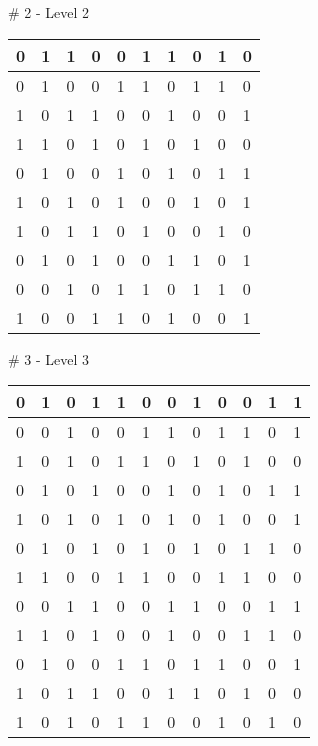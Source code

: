 \smallskip

\# 2 - Level 2 \newline
\begin{tabular}{|m{\collen}|m{\collen}|m{\collen}|m{\collen}|m{\collen}|m{\collen}|m{\collen}|m{\collen}|m{\collen}|m{\collen}|}
\hline
  0 & 1 & 1 & 0 & 0 & 1 & 1 & 0 & 1 & 0 \\
\hline
  0 & 1 & 0 & 0 & 1 & 1 & 0 & 1 & 1 & 0 \\
\hline
  1 & 0 & 1 & 1 & 0 & 0 & 1 & 0 & 0 & 1 \\
\hline
  1 & 1 & 0 & 1 & 0 & 1 & 0 & 1 & 0 & 0 \\
\hline
  0 & 1 & 0 & 0 & 1 & 0 & 1 & 0 & 1 & 1 \\
\hline
  1 & 0 & 1 & 0 & 1 & 0 & 0 & 1 & 0 & 1 \\
\hline
  1 & 0 & 1 & 1 & 0 & 1 & 0 & 0 & 1 & 0 \\
\hline
  0 & 1 & 0 & 1 & 0 & 0 & 1 & 1 & 0 & 1 \\
\hline
  0 & 0 & 1 & 0 & 1 & 1 & 0 & 1 & 1 & 0 \\
\hline
  1 & 0 & 0 & 1 & 1 & 0 & 1 & 0 & 0 & 1 \\
\hline
\end{tabular}


\smallskip

\# 3 - Level 3 \newline
\begin{tabular}{|m{\collen}|m{\collen}|m{\collen}|m{\collen}|m{\collen}|m{\collen}|m{\collen}|m{\collen}|m{\collen}|m{\collen}|m{\collen}|m{\collen}|}
\hline
  0 & 1 & 0 & 1 & 1 & 0 & 0 & 1 & 0 & 0 & 1 & 1 \\
\hline
  0 & 0 & 1 & 0 & 0 & 1 & 1 & 0 & 1 & 1 & 0 & 1 \\
\hline
  1 & 0 & 1 & 0 & 1 & 1 & 0 & 1 & 0 & 1 & 0 & 0 \\
\hline
  0 & 1 & 0 & 1 & 0 & 0 & 1 & 0 & 1 & 0 & 1 & 1 \\
\hline
  1 & 0 & 1 & 0 & 1 & 0 & 1 & 0 & 1 & 0 & 0 & 1 \\
\hline
  0 & 1 & 0 & 1 & 0 & 1 & 0 & 1 & 0 & 1 & 1 & 0 \\
\hline
  1 & 1 & 0 & 0 & 1 & 1 & 0 & 0 & 1 & 1 & 0 & 0 \\
\hline
  0 & 0 & 1 & 1 & 0 & 0 & 1 & 1 & 0 & 0 & 1 & 1 \\
\hline
  1 & 1 & 0 & 1 & 0 & 0 & 1 & 0 & 0 & 1 & 1 & 0 \\
\hline
  0 & 1 & 0 & 0 & 1 & 1 & 0 & 1 & 1 & 0 & 0 & 1 \\
\hline
  1 & 0 & 1 & 1 & 0 & 0 & 1 & 1 & 0 & 1 & 0 & 0 \\
\hline
  1 & 0 & 1 & 0 & 1 & 1 & 0 & 0 & 1 & 0 & 1 & 0 \\
\hline
\end{tabular}



